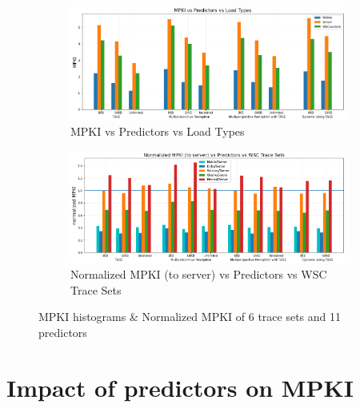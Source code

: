 \begin{figure}[h!] 
     \centering
     \begin{subfigure}{1\textwidth}
         \centering
         \includegraphics[width=1.0\textwidth]{Chapter3/Figs/MPKI vs Predictors vs Load Types.png}
         \caption{MPKI vs Predictors vs Load Types}
         \label{fig:MPKI}
     \end{subfigure}
     \newline
     \begin{subfigure}{1\textwidth}
         \centering
         \includegraphics[width=1\textwidth]{Chapter3/Figs/Normalized MPKI (to server) vs Predictors vs WSC Trace Sets.png}
         \caption{Normalized MPKI (to server) vs Predictors vs WSC Trace Sets}
         \label{fig:Normalized MPKI}
     \end{subfigure}
        \caption{MPKI histograms \& Normalized MPKI of 6 trace sets and 11 predictors }
        \label{fig:MPKI histograms}
\end{figure} %
\label{MPKI results}



\newpage
\section{Impact of predictors on MPKI}

